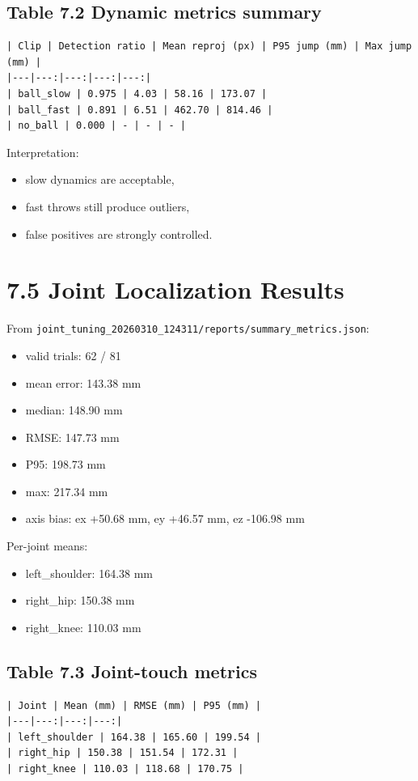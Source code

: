 \subsection{Table 7.2 Dynamic metrics summary}
\begin{verbatim}
| Clip | Detection ratio | Mean reproj (px) | P95 jump (mm) | Max jump (mm) |
|---|---:|---:|---:|---:|
| ball_slow | 0.975 | 4.03 | 58.16 | 173.07 |
| ball_fast | 0.891 | 6.51 | 462.70 | 814.46 |
| no_ball | 0.000 | - | - | - |
\end{verbatim}

Interpretation:
\begin{itemize}
  \item slow dynamics are acceptable,
  \item fast throws still produce outliers,
  \item false positives are strongly controlled.
\end{itemize}

\section{7.5 Joint Localization Results}
From \texttt{joint\_tuning\_20260310\_124311/reports/summary\_metrics.json}:
\begin{itemize}
  \item valid trials: 62 / 81
  \item mean error: 143.38 mm
  \item median: 148.90 mm
  \item RMSE: 147.73 mm
  \item P95: 198.73 mm
  \item max: 217.34 mm
  \item axis bias: ex +50.68 mm, ey +46.57 mm, ez -106.98 mm
\end{itemize}

Per-joint means:
\begin{itemize}
  \item left\_shoulder: 164.38 mm
  \item right\_hip: 150.38 mm
  \item right\_knee: 110.03 mm
\end{itemize}

\subsection{Table 7.3 Joint-touch metrics}
\begin{verbatim}
| Joint | Mean (mm) | RMSE (mm) | P95 (mm) |
|---|---:|---:|---:|
| left_shoulder | 164.38 | 165.60 | 199.54 |
| right_hip | 150.38 | 151.54 | 172.31 |
| right_knee | 110.03 | 118.68 | 170.75 |
\end{verbatim}

